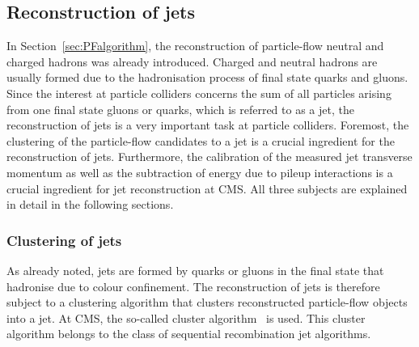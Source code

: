 \subsection{Reconstruction of jets} 
\label{sec:JetReconstruction}
In Section~\ref{sec:PFalgorithm}, the reconstruction of particle-flow neutral and charged hadrons was already introduced.
Charged and neutral hadrons are usually formed due to the hadronisation process of final state quarks and gluons.
Since the interest at particle colliders concerns the sum of all particles arising from one final state gluons or quarks, which is referred to as a jet, the reconstruction of jets is a very important task at particle colliders.
Foremost, the clustering of the particle-flow candidates to a jet is a crucial ingredient for the reconstruction of jets.
Furthermore, the calibration of the measured jet transverse momentum as well as the subtraction of energy due to pileup interactions is a crucial ingredient for jet reconstruction at CMS.
All three subjects are explained in detail in the following sections.
\subsubsection*{Clustering of jets}
As already noted, jets are formed by quarks or gluons in the final state that hadronise due to colour confinement. 
The reconstruction of jets is therefore subject to a clustering algorithm that clusters reconstructed particle-flow objects into a jet.
At CMS, the so-called \antikt cluster algorithm~\cite{bib:JetClustering_2008} is used.
This cluster algorithm belongs to the class of sequential recombination jet algorithms.

